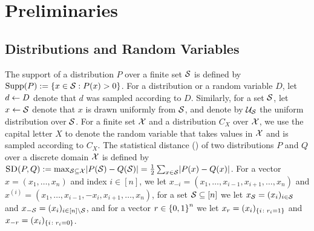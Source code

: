 
\section{Preliminaries}\label{sec:preliminaries}






\subsection{Distributions and Random Variables}\label{sec:prelim:dist}
The support of a distribution $P$ over a finite set ${\cal S}$ is defined by $\Supp(P) \eqdef \set{x\in \cS: P(x)>0}$. For a distribution or a random variable $D$, let $d\leftarrow D$ denote that $d$ was sampled according to $D$. Similarly,  for a set ${\cal S}$, let $x \leftarrow {\cal S}$ denote that $x$ is drawn uniformly from ${\cal S}$, and denote by ${\cal U}_{{\cal S}}$ the uniform distribution over ${\cal S}$. For a finite set ${\cal X}$ and a distribution $C_X$ over ${\cal X}$, we use the capital letter $X$ to denote the random variable that takes values in ${\cal X}$ and is sampled according to $C_X$. The {\sf statistical distance} () of two distributions $P$ and $Q$ over a discrete domain ${\cal X}$ is defined by $\sdist{P}{Q} \eqdef \max_{\cS\subseteq \cX} \size{P(\cS)-Q(\cS)} = \frac{1}{2} \sum_{x \in \cS}\size{P(x)-Q(x)}$. 
For a vector $x = (x_1,\ldots,x_n)$ and index $i\in [n]$, we let $x_{-i} = (x_1,\ldots,x_{i-1},x_{i+1},\ldots,x_n)$ and $x^{(i)} = (x_1,\ldots,x_{i-1}, -x_i, x_{i+1},\ldots,x_n)$, for a set ${\cal S} \subseteq [n]$ we let $x_{{\cal S}} = (x_i)_{i \in {\cal S}}$ and $x_{-{\cal S}} = (x_i)_{i \in [n]\setminus {\cal S}}$, and for a vector $r \in \zo^n$ we let $x_r = (x_i)_{\set{i \colon r_i = 1}}$ and $x_{-r} = (x_i)_{\set{i \colon r_i = 0}}$.






